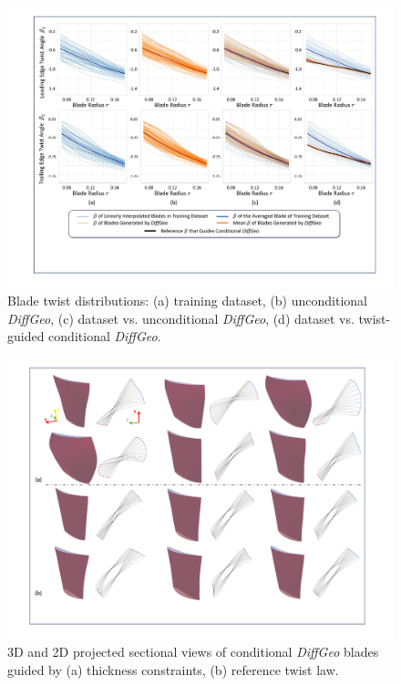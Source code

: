 \begin{figure}[!htb]
    \begin{center}
        \includegraphics[width=1\linewidth]{chapter6/fig/fig_blade_beta.pdf}
    \end{center}
    \caption{
        \small Blade twist distributions: (a) training dataset, (b) unconditional \textit{DiffGeo}, (c) dataset vs. unconditional \textit{DiffGeo}, (d) dataset vs. twist-guided conditional \textit{DiffGeo}.
    }
    \label{ch6:fig:blade_beta}
\end{figure}

\begin{figure}[!htb]
    \begin{center}
        \includegraphics[width=1\linewidth]{chapter6/fig/fig_conditional_blades.pdf}
    \end{center}
    \caption{
        \small 3D and 2D projected sectional views of conditional \textit{DiffGeo} blades guided by (a) thickness constraints, (b) reference twist law.
    }
    \label{ch6:fig:conditional_blades}
\end{figure}


